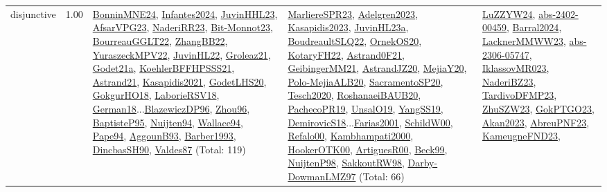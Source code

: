 {\begin{longtable}{p{3cm}r>{\raggedright\arraybackslash}p{6cm}>{\raggedright\arraybackslash}p{6cm}>{\raggedright\arraybackslash}p{8cm}}
\index{disjunctive}\index{Constraints!disjunctive}disjunctive &  1.00 & \hyperref[detail:BonninMNE24]{BonninMNE24}, \hyperref[detail:Infantes2024]{Infantes2024}, \hyperref[detail:JuvinHHL23]{JuvinHHL23}, \hyperref[detail:AfsarVPG23]{AfsarVPG23}, \hyperref[detail:NaderiRR23]{NaderiRR23}, \hyperref[detail:Bit-Monnot23]{Bit-Monnot23}, \hyperref[detail:BourreauGGLT22]{BourreauGGLT22}, \hyperref[detail:ZhangBB22]{ZhangBB22}, \hyperref[detail:YuraszeckMPV22]{YuraszeckMPV22}, \hyperref[detail:JuvinHL22]{JuvinHL22}, \hyperref[detail:Groleaz21]{Groleaz21}, \hyperref[detail:Godet21a]{Godet21a}, \hyperref[detail:KoehlerBFFHPSSS21]{KoehlerBFFHPSSS21}, \hyperref[detail:Astrand21]{Astrand21}, \hyperref[detail:Kasapidis2021]{Kasapidis2021}, \hyperref[detail:GodetLHS20]{GodetLHS20}, \hyperref[detail:GokgurHO18]{GokgurHO18}, \hyperref[detail:LaborieRSV18]{LaborieRSV18}, \hyperref[detail:German18]{German18}...\hyperref[detail:BlazewiczDP96]{BlazewiczDP96}, \hyperref[detail:Zhou96]{Zhou96}, \hyperref[detail:BaptisteP95]{BaptisteP95}, \hyperref[detail:Nuijten94]{Nuijten94}, \hyperref[detail:Wallace94]{Wallace94}, \hyperref[detail:Pape94]{Pape94}, \hyperref[detail:AggounB93]{AggounB93}, \hyperref[detail:Barber1993]{Barber1993}, \hyperref[detail:DincbasSH90]{DincbasSH90}, \hyperref[detail:Valdes87]{Valdes87} (Total: 119) & \hyperref[detail:MarliereSPR23]{MarliereSPR23}, \hyperref[detail:Adelgren2023]{Adelgren2023}, \hyperref[detail:Kasapidis2023]{Kasapidis2023}, \hyperref[detail:JuvinHL23a]{JuvinHL23a}, \hyperref[detail:BoudreaultSLQ22]{BoudreaultSLQ22}, \hyperref[detail:OrnekOS20]{OrnekOS20}, \hyperref[detail:KotaryFH22]{KotaryFH22}, \hyperref[detail:Astrand0F21]{Astrand0F21}, \hyperref[detail:GeibingerMM21]{GeibingerMM21}, \hyperref[detail:AstrandJZ20]{AstrandJZ20}, \hyperref[detail:MejiaY20]{MejiaY20}, \hyperref[detail:Polo-MejiaALB20]{Polo-MejiaALB20}, \hyperref[detail:SacramentoSP20]{SacramentoSP20}, \hyperref[detail:Tesch2020]{Tesch2020}, \hyperref[detail:RoshanaeiBAUB20]{RoshanaeiBAUB20}, \hyperref[detail:PachecoPR19]{PachecoPR19}, \hyperref[detail:UnsalO19]{UnsalO19}, \hyperref[detail:YangSS19]{YangSS19}, \hyperref[detail:DemirovicS18]{DemirovicS18}...\hyperref[detail:Farias2001]{Farias2001}, \hyperref[detail:SchildW00]{SchildW00}, \hyperref[detail:Refalo00]{Refalo00}, \hyperref[detail:Kambhampati2000]{Kambhampati2000}, \hyperref[detail:HookerOTK00]{HookerOTK00}, \hyperref[detail:ArtiguesR00]{ArtiguesR00}, \hyperref[detail:Beck99]{Beck99}, \hyperref[detail:NuijtenP98]{NuijtenP98}, \hyperref[detail:SakkoutRW98]{SakkoutRW98}, \hyperref[detail:Darby-DowmanLMZ97]{Darby-DowmanLMZ97} (Total: 66) & \hyperref[detail:LuZZYW24]{LuZZYW24}, \hyperref[detail:abs-2402-00459]{abs-2402-00459}, \hyperref[detail:Barral2024]{Barral2024}, \hyperref[detail:LacknerMMWW23]{LacknerMMWW23}, \hyperref[detail:abs-2306-05747]{abs-2306-05747}, \hyperref[detail:IklassovMR023]{IklassovMR023}, \hyperref[detail:NaderiBZ23]{NaderiBZ23}, \hyperref[detail:TardivoDFMP23]{TardivoDFMP23}, \hyperref[detail:ZhuSZW23]{ZhuSZW23}, \hyperref[detail:GokPTGO23]{GokPTGO23}, \hyperref[detail:Akan2023]{Akan2023}, \hyperref[detail:AbreuPNF23]{AbreuPNF23}, \hyperref[detail:KameugneFND23]{KameugneFND23}, 
\end{longtable}}
